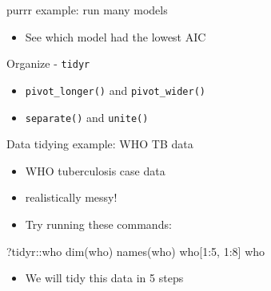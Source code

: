\documentclass[
  ignorenonframetext,
]{beamer}
\newenvironment{Shaded}{\begin{snugshade}}{\end{snugshade}}
\newcommand{\AttributeTok}[1]{\textcolor[rgb]{0.77,0.63,0.00}{#1}}
\newcommand{\DecValTok}[1]{\textcolor[rgb]{0.00,0.00,0.81}{#1}}
\newcommand{\FunctionTok}[1]{\textcolor[rgb]{0.00,0.00,0.00}{#1}}
\newcommand{\NormalTok}[1]{#1}
\newcommand{\SpecialCharTok}[1]{\textcolor[rgb]{0.00,0.00,0.00}{#1}}
\newcommand{\StringTok}[1]{\textcolor[rgb]{0.31,0.60,0.02}{#1}}
\providecommand{\tightlist}{%
  \setlength{\itemsep}{0pt}\setlength{\parskip}{0pt}}
\begin{document}
\begin{frame}[fragile]{purrr example: run many models}
\protect\hypertarget{purrr-example-run-many-models-3}{}
\begin{itemize}
\tightlist
\item
  See which model had the lowest AIC
\end{itemize}

\begin{Shaded}
\end{Shaded}
\end{frame}

\begin{frame}[fragile]{Organize - \texttt{tidyr}}
\protect\hypertarget{organize---tidyr}{}
\begin{itemize}
\tightlist
\item
  \texttt{pivot\_longer()} and \texttt{pivot\_wider()}
\item
  \texttt{separate()} and \texttt{unite()}
\end{itemize}
\end{frame}

\begin{frame}[fragile]{Data tidying example: WHO TB data}
\protect\hypertarget{data-tidying-example-who-tb-data}{}
\begin{itemize}
\tightlist
\item
  WHO tuberculosis case data
\item
  realistically messy!
\item
  Try running these commands:
\end{itemize}

\begin{Shaded}
\begin{Highlighting}[]
\NormalTok{?tidyr}\SpecialCharTok{::}\NormalTok{who}
\FunctionTok{dim}\NormalTok{(who)}
\FunctionTok{names}\NormalTok{(who)}
\NormalTok{who[}\DecValTok{1}\SpecialCharTok{:}\DecValTok{5}\NormalTok{, }\DecValTok{1}\SpecialCharTok{:}\DecValTok{8}\NormalTok{]}
\NormalTok{who}
\end{Highlighting}
\end{Shaded}

\begin{itemize}
\tightlist
\item
  We will tidy this data in 5 steps
\end{itemize}
\end{frame}
\end{document}
